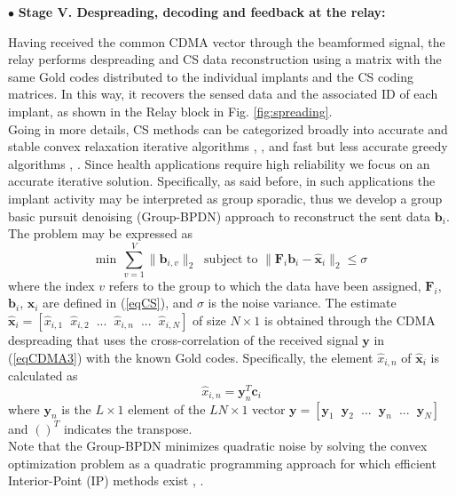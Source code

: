 \noindent $\bullet$ \textbf{Stage V. Despreading, decoding and feedback at the relay:}

Having received the common CDMA vector through the beamformed signal, the relay performs despreading and CS data reconstruction using a matrix with the same Gold codes distributed to the individual implants and the CS coding matrices. In this way, it recovers the sensed data and the associated ID of each implant, as shown in the Relay block in Fig. \ref{fig:spreading}.\\ 

Going in more details, CS methods can be categorized broadly into accurate and stable convex relaxation iterative algorithms \cite{Donoho06}, \cite{Candes08}, and fast but less accurate greedy algorithms \cite{Masood13}, \cite{Dai09}. Since health applications require high reliability we focus on an accurate iterative solution. Specifically, as said before, in such applications the implant activity may be interpreted as group sporadic, thus we develop a group basic pursuit denoising (Group-BPDN) approach to reconstruct the sent data $\mathbf{b}_i$.
The  problem may be expressed as \cite{BergFriedlander:2008}
\begin{equation}
	\textrm{min} \    \  \sum_{v=1}^V\|\mathbf{b}_{i,v} \|_2   \ \textrm{  subject to } \|\mathbf{F}_i\mathbf{b}_i-\hat{\mathbf{x}}_{i} \|_2 \le \sigma
	\label{eqCSgroup}
\end{equation}
where the index $v$ refers to the group to which the data have been assigned, $\mathbf{F}_{i}$, $\mathbf{b}_{i}$, $\mathbf{x}_{i}$ are defined in (\ref{eqCS}), and $\sigma$ is the noise variance. The estimate  $\hat{\mathbf{x}}_{i} = [\hat{x}_{i,1} \phantom{x} \hat{x}_{i,2} \phantom{x} ... \phantom{x} \hat{x}_{i,n} \phantom{x} ... \phantom{x} \hat{x}_{i,N}]$ of size $N \times 1$ is obtained through the CDMA despreading that uses the cross-correlation of the received signal $\mathbf{y}$ in (\ref{eqCDMA3}) with the known Gold codes. 
Specifically, the element $\hat{x}_{i,n}$ of $\hat{\mathbf{x}}_{i}$ is calculated as
\begin{equation}
\hat{x}_{i,n}=\mathbf{y}^T_n\mathbf{c}_i
\label{eqCDMA4b}
\end{equation}
where $\mathbf{y}_n$ is the $L \times 1$ element of the $LN \times 1$ vector $\mathbf{y} = [\mathbf{y}_1 \phantom{x} \mathbf{y}_2 \phantom{x} ... \phantom{x} \mathbf{y}_n \phantom{x} ... \phantom{x} \mathbf{y}_N]$ and $()^T$ indicates the transpose.
\\
Note that the Group-BPDN minimizes quadratic
noise by solving the convex optimization
problem as a quadratic programming approach for which
efficient Interior-Point (IP) methods exist \cite{BergFriedlander:2008},
\cite{berg2}.


